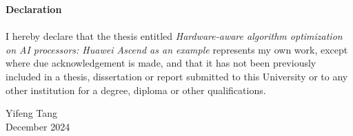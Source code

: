 \centering
{\bf \large Declaration}\\
~\\
\justifying
I hereby declare that the thesis entitled \textit{Hardware-aware algorithm optimization on AI processors: Huawei Ascend as an example} represents my own work, except where due acknowledgement is made, and that it has not been previously included in a thesis, dissertation or report submitted to this University or to any other institution for a degree, diploma or other qualifications.

\flushright

Yifeng Tang\\
December 2024\\

\justifying